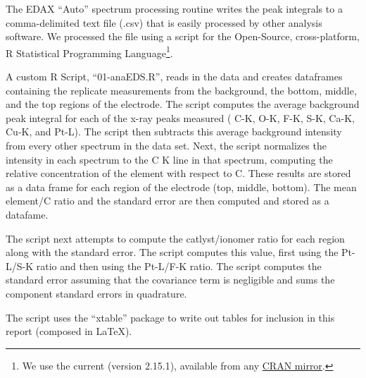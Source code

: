 The EDAX ``Auto'' spectrum processing routine writes the peak
integrals to a comma-delimited text file (.csv) that is easily
processed by other analysis software. We processed the file using
a script for the Open-Source, cross-platform, R Statistical
Programming Language\footnote{We use the current (version 2.15.1),
available from any  \href{http://cran.r-project.org/}{CRAN mirror}.}.

A custom R Script, ``01-anaEDS.R'', reads in the data and creates
dataframes containing the replicate measurements from the background,
the bottom, middle, and the top regions of the electrode. The script
computes the average background peak integral for each of the 
x-ray peaks measured ( C-K, O-K, F-K, S-K, Ca-K, Cu-K, and Pt-L).
The script then subtracts this average background intensity from
every other spectrum in the data set. Next, the script normalizes
the intensity in each spectrum to the C K line in that spectrum,
computing the relative concentration of the element with respect
to C. These results are stored as a data frame for each region
of the electrode (top, middle, bottom). The mean element/C ratio
and the standard error are then computed and stored as a datafame.

The script next attempts to compute the catlyst/ionomer ratio for
each region along with the standard error. The script computes this
value, first using the Pt-L/S-K ratio and then using the Pt-L/F-K
ratio. The script computes the standard error assuming that the
covariance term is negligible and sums the component standard errors
in quadrature.

The script uses the ``xtable'' package to write out tables for
inclusion in this report (composed in \LaTeX).

\endinput
